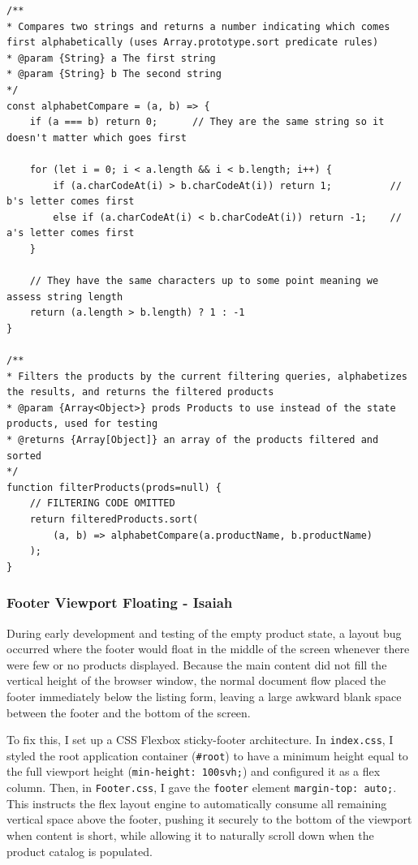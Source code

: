 \documentclass{article}[12pt]
\begin{document}
\begin{lstlisting}
/**
* Compares two strings and returns a number indicating which comes first alphabetically (uses Array.prototype.sort predicate rules)
* @param {String} a The first string
* @param {String} b The second string
*/
const alphabetCompare = (a, b) => {
    if (a === b) return 0;      // They are the same string so it doesn't matter which goes first

    for (let i = 0; i < a.length && i < b.length; i++) {
        if (a.charCodeAt(i) > b.charCodeAt(i)) return 1;          // b's letter comes first
        else if (a.charCodeAt(i) < b.charCodeAt(i)) return -1;    // a's letter comes first
    }

    // They have the same characters up to some point meaning we assess string length
    return (a.length > b.length) ? 1 : -1
}

/**
* Filters the products by the current filtering queries, alphabetizes the results, and returns the filtered products
* @param {Array<Object>} prods Products to use instead of the state products, used for testing
* @returns {Array[Object]} an array of the products filtered and sorted
*/
function filterProducts(prods=null) {
    // FILTERING CODE OMITTED
    return filteredProducts.sort(
        (a, b) => alphabetCompare(a.productName, b.productName)
    );
}

\end{lstlisting}

\subsubsection{Footer Viewport Floating - Isaiah}
During early development and testing of the empty product state, a layout bug occurred where the footer would float in the middle of the screen whenever there were few or no products displayed. Because the main content did not fill the vertical height of the browser window, the normal document flow placed the footer immediately below the listing form, leaving a large awkward blank space between the footer and the bottom of the screen.

To fix this, I set up a CSS Flexbox sticky-footer architecture. In \texttt{index.css}, I styled the root application container (\texttt{\#root}) to have a minimum height equal to the full viewport height (\texttt{min-height: 100svh;}) and configured it as a flex column. Then, in \texttt{Footer.css}, I gave the \texttt{footer} element \texttt{margin-top: auto;}. This instructs the flex layout engine to automatically consume all remaining vertical space above the footer, pushing it securely to the bottom of the viewport when content is short, while allowing it to naturally scroll down when the product catalog is populated.
\end{document}

